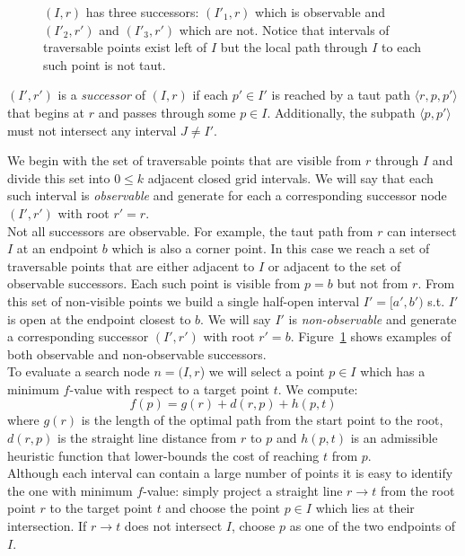 \begin{figure}[tb]
  \begin{center}
    
  \end{center}
  \caption{$(I, r)$ has three successors: $(I'_1, r)$ which is observable
and $(I'_2, r')$ and $(I'_3, r')$ which are not. Notice that intervals of traversable
points exist left of $I$ but the local path through $I$ to each such point is
not taut.}
\label{fig::successors}
\end{figure}

\begin{defi}
\label{defi::successors}
$(I', r')$ is a \emph{successor} of
$(I, r)$ if each $p' \in I'$ is reached
by a taut path $\langle r, p,  p' \rangle$ that begins
at $r$ and passes through some $p \in I$.  Additionally, 
the subpath $\langle p, p' \rangle$ must not intersect any 
interval $J \neq I'$.
\end{defi}
We begin with the set of traversable points that are 
visible from $r$ through $I$ and divide this set into $0 \leq k$
adjacent closed grid intervals.
We will say that each such interval is \emph{observable} and 
generate for each a corresponding successor node 
$(I', r')$ with root $r' = r$.
\\
Not all successors are observable.
For example, the taut path from $r$ can intersect 
$I$ at an endpoint $b$ which is also a corner point.
In this case we reach a set of traversable points that 
are either adjacent to $I$ or adjacent to the set of 
observable successors.
Each such point is visible from $p = b$ but not 
from $r$.  From this set of non-visible points we build a 
single half-open interval $I' = [a', b')$ s.t. $I'$ is open at the 
endpoint closest to $b$.
We will say $I'$ is \emph{non-observable} and generate a 
corresponding successor $(I', r')$ with root $r' = b$.  
Figure~\ref{fig::successors} shows examples of both
observable and non-observable successors.
%
\\
To evaluate a search node $n = (I, r$) we will select a point $p \in I$ 
which has a minimum $f$-value with respect to a target point $t$.
We compute: 
\begin{equation}
\label{eq::f}
f(p) = g(r) + d(r, p) + h(p, t)
\end{equation}
where $g(r)$ is the length of the optimal path from the start point to 
the root, $d(r, p)$ is the straight line distance from $r$ to $p$
and $h(p, t)$ is an admissible heuristic function that lower-bounds the cost of
reaching $t$ from $p$.
\\
Although each interval can contain a large number of points it is easy to
identify the one with minimum $f$-value: simply project a straight line $r
\rightarrow t$ from the root point $r$ to the target point $t$ and choose the
point $p \in I$ which lies at their intersection.  If $r \rightarrow t$ does not
intersect $I$, choose $p$ as one of the two endpoints of $I$.

